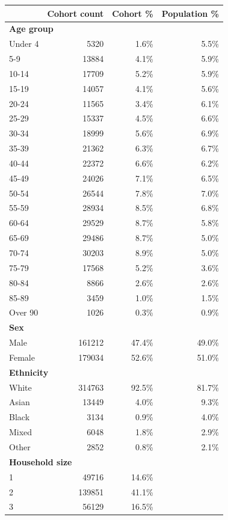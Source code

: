 \begin{tabular}{lrrr}
\hline
& Cohort count & Cohort \% & Population \% \\
\hline
\multicolumn{4}{l}{\textbf{Age group}} \\
Under 4 & 5320 & 1.6\% & 5.5\% \\
5-9 & 13884 & 4.1\% & 5.9\% \\
10-14 & 17709 & 5.2\% & 5.9\% \\
15-19 & 14057 & 4.1\% & 5.6\% \\
20-24 & 11565 & 3.4\% & 6.1\% \\
25-29 & 15337 & 4.5\% & 6.6\% \\
30-34 & 18999 & 5.6\% & 6.9\% \\
35-39 & 21362 & 6.3\% & 6.7\% \\
40-44 & 22372 & 6.6\% & 6.2\% \\
45-49 & 24026 & 7.1\% & 6.5\% \\
50-54 & 26544 & 7.8\% & 7.0\% \\
55-59 & 28934 & 8.5\% & 6.8\% \\
60-64 & 29529 & 8.7\% & 5.8\% \\
65-69 & 29486 & 8.7\% & 5.0\% \\
70-74 & 30203 & 8.9\% & 5.0\% \\
75-79 & 17568 & 5.2\% & 3.6\% \\
80-84 & 8866 & 2.6\% & 2.6\% \\
85-89 & 3459 & 1.0\% & 1.5\% \\
Over 90 & 1026 & 0.3\% & 0.9\% \\
\hline
\multicolumn{4}{l}{\textbf{Sex}} \\
Male & 161212 & 47.4\% & 49.0\% \\
Female & 179034 & 52.6\% & 51.0\% \\
\hline
\multicolumn{4}{l}{\textbf{Ethnicity}} \\
White & 314763 & 92.5\% & 81.7\% \\
Asian & 13449 & 4.0\% & 9.3\% \\
Black & 3134 & 0.9\% & 4.0\% \\
Mixed & 6048 & 1.8\% & 2.9\% \\
Other & 2852 & 0.8\% & 2.1\% \\
\hline
\multicolumn{4}{l}{\textbf{Household size}} \\
1 & 49716 & 14.6\% &  \\
2 & 139851 & 41.1\% &  \\
3 & 56129 & 16.5\% &  \\

\end{tabular}
